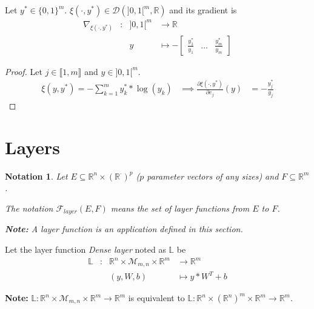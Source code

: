 \documentclass[11pt,en]{elegantpaper}
\newtheorem{notation}{Notation}
\newcommand{\Real}{\mathbb{R}}
\begin{document}
\begin{proposition}
  {\normalfont
    Let $y^* \in \{0,1\}^m$. $\xi(\cdot,y^*) \in \mathcal{D}(]0,1[^m, \Real)$ and its gradient is \begin{equation} \label{prop:cce_differential}
      \begin{array}{llll}
        \nabla_{\xi(\cdot,y^*)} & : & ]0,1[^m  & \longrightarrow \Real \\
        &   & y & \longmapsto - \begin{bmatrix}
          \frac{y^*_1}{y_1} & \ldots & \frac{y^*_m}{y_m}
        \end{bmatrix}
      \end{array}
    \end{equation}
  }
\end{proposition}

\begin{proof}
  Let $j \in \llbracket 1,m \rrbracket$ and $y \in ]0,1[^m$. \begin{equation*}
    \begin{array}{lll}
      \xi(y,y^*) = - \sum_{k=1}^m y_k^* * \log(y_k) & \implies \frac{\partial \xi(\cdot,y^*)}{\partial e_j} (y) & = - \frac{y_j^*}{y_j}
    \end{array}
  \end{equation*}
\end{proof}

\section{Layers}

\begin{notation}
  Let $E \subseteq \Real^n \times (\Real^{\cdot})^p$ ($p$ parameter vectors of any sizes) and $F \subseteq \Real^m$. \par
  The notation $\mathcal{F}_{layer}(E,F)$ means the set of layer functions from $E$ to $F$. \par
  \textbf{Note:} A layer function is an application defined in this section. \par
\end{notation}

\begin{definition}
  Let the layer function \textit{Dense layer} noted as $\mathbb{L}$ be
  \begin{equation*}
    \begin{array}{llll}
      \mathbb{L} & : & \Real^n \times \mathcal{M}_{m,n} \times \Real^m & \longrightarrow \Real^m \\
      &   & (y,W,b) & \longmapsto y * W^T + b
    \end{array}
  \end{equation*} \par
  \textbf{Note:} $\mathbb{L} : \Real^n \times \mathcal{M}_{m,n} \times \Real^m \longrightarrow \Real^m$
  is equivalent to $\mathbb{L} : \Real^n \times (\Real^n)^{m} \times \Real^m \longrightarrow \Real^m$.
\end{definition}
\end{document}
